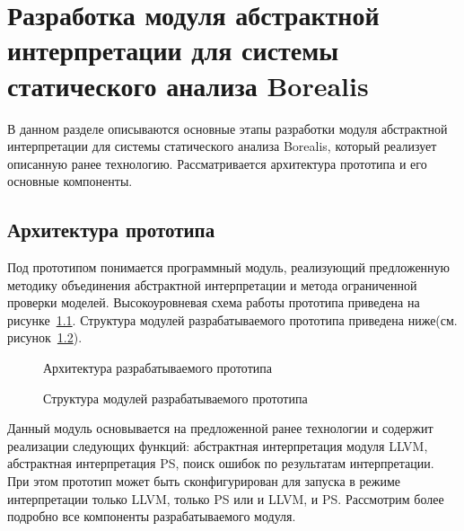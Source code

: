 \chapter{Разработка модуля абстрактной интерпретации для системы статического
анализа Borealis}
\label{chapter:implementation}
В данном разделе описываются основные этапы разработки модуля абстрактной 
интерпретации для системы статического анализа Borealis, который реализует
описанную ранее технологию. Рассматривается архитектура прототипа и его
основные компоненты.

\section{Архитектура прототипа}
Под прототипом понимается программный модуль, реализующий предложенную методику
объединения абстрактной интерпретации и метода ограниченной проверки моделей.
Высокоуровневая схема работы прототипа приведена на 
рисунке~\ref{image:NewBorealisOverview}. Структура модулей разрабатываемого
прототипа приведена ниже(см. рисунок~\ref{image:prototypeArchitecture}).
\begin{figure}[h!]
\caption{Архитектура разрабатываемого прототипа}
\label{image:NewBorealisOverview}
\end{figure}
\begin{figure}[h!]
\caption{Структура модулей разрабатываемого прототипа}
\label{image:prototypeArchitecture}
\end{figure}

Данный модуль основывается на предложенной ранее технологии и содержит 
реализации следующих функций: абстрактная интерпретация модуля LLVM, 
абстрактная интерпретация PS, поиск ошибок по результатам интерпретации. 
При этом прототип может быть сконфигурирован для запуска в режиме интерпретации
только LLVM, только PS или и LLVM, и PS. Рассмотрим более подробно все 
компоненты разрабатываемого модуля.

